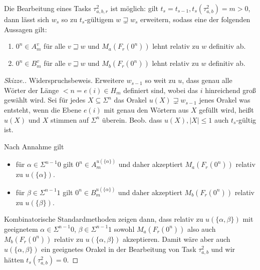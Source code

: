 \begin{lemma}\label{lemma:myoracle-disjnp}
    Die Bearbeitung eines Tasks $\tau^2_{a,b,r}$ ist möglich: gilt $t_s=t_{s-1}, t_{s}(\tau^2_{a,b})=m>0$, dann lässt sich $w_{s}$ so zu $t_{s}$-gültigem $w\sqsupsetneq w_{s}$ erweitern, sodass eine der folgenden Aussagen gilt:
    \begin{enumerate}[nosep,endpenalty=10000]
        \item $0^n\in A_m^v$ für alle $v\sqsupseteq w$ und $M_a(F_r(0^n))$ lehnt relativ zu $w$ definitiv ab.
        \item $0^n\in B_m^v$ für alle $v\sqsupseteq w$ und $M_b(F_r(0^n))$ lehnt relativ zu $w$ definitiv ab.
    \end{enumerate}
\end{lemma}
\begin{proof}[Skizze.]
    Widerspruchsbeweis. Erweitere $w_{s-1}$ so weit zu $u$, dass genau alle Wörter der Länge $<n=e(i)\in H_m$ definiert sind, wobei das $i$ hinreichend groß gewählt wird. Sei für jedes $X\subseteq \Sigma^n$ das Orakel $u(X)\sqsupsetneq w_{s-1}$ jenes Orakel was entsteht, wenn die Ebene $e(i)$ mit genau den Wörtern aus $X$ gefüllt wird, heißt $u(X)$ und $X$ stimmen auf $\Sigma^n$ überein. Beob. dass $u(X), |X|\leq 1$ auch $t_{s}$-gültig ist.

    Nach Annahme gilt
    \begin{itemize}[nosep]
        \item für $\alpha\in \Sigma^{n-1}0$ gilt $0^n\in A_m^{u(\{\alpha\})}$ und daher akzeptiert $M_a(F_r(0^n))$ relativ zu $u(\{\alpha\})$.
        \item für $\beta\in \Sigma^{n-1}1$ gilt $0^n\in B_m^{u(\{\alpha\})}$ und daher akzeptiert $M_b(F_r(0^n))$ relativ zu $u(\{\beta\})$.
    \end{itemize}
    Kombinatorische Standardmethoden zeigen dann, dass relativ zu $u(\{\alpha,\beta\})$ mit geeignetem $\alpha\in\Sigma^{n-1}0$, $\beta\in\Sigma^{n-1}1$ sowohl $M_a(F_r(0^n))$ also auch $M_b(F_r(0^n))$ relativ zu $u(\{\alpha,\beta\})$ akzeptieren.
    Damit wäre aber auch $u(\{\alpha,\beta\})$ ein geeignetes Orakel in der Bearbeitung von Task $\tau^2_{a,b}$ und wir hätten $t_{s}(\tau^2_{a,b})=0$.
\end{proof}
